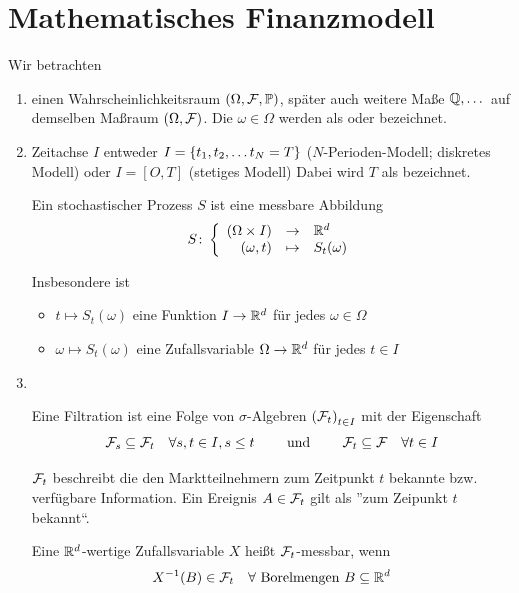 \section{Mathematisches Finanzmodell}

Wir betrachten
\begin{enumerate}[leftmargin=*]
	\item einen Wahrscheinlichkeitsraum $(\Omega, \mathcal{F}, \mathbb{P})$, später auch weitere Maße $\mathbb{Q}, \dots$ auf demselben Maßraum $(\Omega, \mathcal{F})$. Die $\omega \in \Omega$ werden als  oder  bezeichnet.
	\item Zeitachse $I$ entweder $I = \left\{ t_1, t_2, \dots t_N = T \right\}$ ($N$-Perioden-Modell; diskretes Modell) oder $I = [O,T]$ (stetiges Modell)
	Dabei wird $T$ als  bezeichnet.
	\begin{definition}
		Ein stochastischer Prozess $S$ ist eine messbare Abbildung 
		\begin{equation*}
		S \colon \left\lbrace \begin{array}{rcl} (\Omega \times I) & \to & \mathbb{R}^d \\(\omega, t) & \mapsto & S_t(\omega) \end{array} \right.
		\end{equation*}
	\end{definition}
	Insbesondere ist 
	\begin{itemize}[nolistsep, topsep=-\parskip]
		\item $t \mapsto S_t(\omega)$ eine Funktion $I \to \mathbb{R}^d$ für jedes $\omega \in \Omega$ 
		\item $\omega \mapsto S_t(\omega)$ eine Zufallsvariable $\Omega \to \mathbb{R}^d$ für jedes $t \in I$
	\end{itemize}
	\item ~\vspace{-2em}
	 \begin{definition}[Filtration]
	 	Eine Filtration ist eine Folge von $\sigma$-Algebren $\left( \mathcal{F}_t \right)_{t \in I}$ mit der Eigenschaft
	 	\begin{equation*}
	 	\mathcal{F}_s \subseteq \mathcal{F}_t \quad \forall s,t \in I, s \le t \qquad \text{ und } \qquad \mathcal{F}_t \subseteq \mathcal{F} \quad \forall t \in I
	 	\end{equation*}
	 \end{definition}
 	\begin{*interpretation}
 		$\mathcal{F}_t$ beschreibt die den Marktteilnehmern zum Zeitpunkt $t$ bekannte bzw. verfügbare Information. Ein Ereignis $A \in \mathcal{F}_t$ gilt als ''zum Zeipunkt $t$ bekannt``.
 	\end{*interpretation}
	
	\begin{*erinnerung_inline}
		Eine $\mathbb{R}^d$-wertige Zufallsvariable $X$ heißt $\mathcal{F}_t$-messbar, wenn
		\begin{equation*}
		X^{-1}(B) \in \mathcal{F}_t \quad \forall \text{ Borelmengen } B \subseteq \mathbb{R}^d
		\end{equation*}
	\end{*erinnerung_inline}


\end{enumerate}
